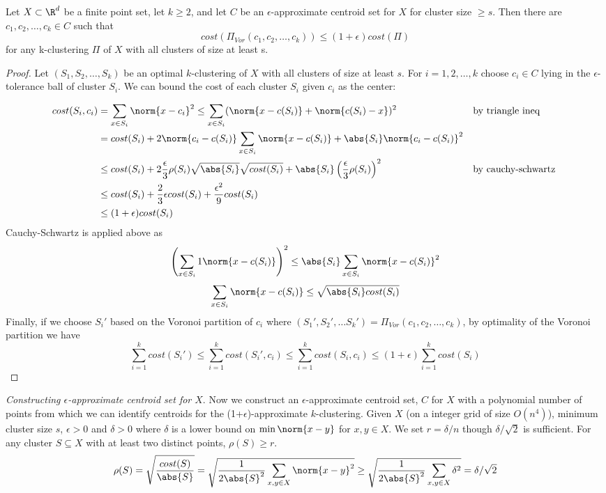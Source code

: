 \begin{lemma}
Let $X \subset \R^d$ be a finite point set, let $k\geq 2$, and let $C$ be an $\epsilon$-approximate centroid set for $X$ for cluster size $\geq s$. Then there are $c_1, c_2, \dots, c_k \in C$ such that 
$$cost(\Pi_{Vor}(c_1, c_2, \dots, c_k)) \leq (1+\epsilon)cost(\Pi)$$
for any k-clustering $\Pi$ of $X$ with all clusters of size at least s. 
\end{lemma}
\begin{proof}
Let $(S_1, S_2, \dots, S_k)$ be an optimal $k$-clustering of $X$ with all clusters of size at least $s$. For $i = 1,2,\dots,k$ choose $c_i \in C$ lying in the $\epsilon$-tolerance ball of cluster $S_i$. We can bound the cost of each cluster $S_i$ given $c_i$ as the center:

\begin{align*}
    cost(S_i, c_i) & = \sum_{x \in S_i}\norm{x-c_i}^2 \leq \sum_{x \in S_i} (\norm{x-c(S_i)} + \norm{c(S_i)-x})^2  && \text{by triangle ineq} \\
    & = cost(S_i) + 2\norm{c_i-c(S_i)}\sum_{x \in S_i}\norm{x-c(S_i)} + \abs{S_i}\norm{c_i-c(S_i)}^2 \\
    & \leq cost(S_i) + 2\frac{\epsilon}{3}\rho(S_i)\sqrt{\abs{S_i}}\sqrt{cost(S_i)} + \abs{S_i}\left(\frac{\epsilon}{3}\rho(S_i) \right)^2 && \text{by cauchy-schwartz } \\
    & \leq cost(S_i) + \frac{2}{3}\epsilon cost(S_i) + \frac{\epsilon^2}{9}cost(S_i) \\
    & \leq (1+\epsilon) cost(S_i)
\end{align*}
Cauchy-Schwartz is applied above as
$$\left( \sum_{x \in S_i}1\norm{x-c(S_i)} \right)^2 \leq \abs{S_i}\sum_{x \in S_i}\norm{x-c(S_i)}^2 $$
$$ \sum_{x \in S_i}\norm{x-c(S_i)} \leq \sqrt{\abs{S_i}cost(S_i)} $$
Finally, if we choose $S_i'$ based on the Voronoi partition of $c_i$
where $(S_1', S_2', \dots S_k') =\Pi_{Vor}(c_1, c_2, \dots, c_k) $, by optimality of the Voronoi partition we have
$$\sum_{i=1}^k cost(S_i') \leq \sum_{i=1}^k cost(S_i', c_i) \leq \sum_{i=1}^k cost(S_i, c_i) \leq (1+\epsilon) \sum_{i=1}^k cost(S_i)$$
\end{proof}

\noindent \emph{Constructing $\epsilon$-approximate centroid set for $X$}. Now we construct an $\epsilon$-approximate centroid set, $C$ for $X$ with a polynomial number of points from which we can identify centroids for the (1+$\epsilon$)-approximate $k$-clustering. Given $X$ (on a integer grid of size $O(n^4)$), minimum cluster size $s$, $\epsilon >0$ and $\delta >0$ where $\delta$ is a lower bound on $\min\norm{x-y}$ for $x,y\in X$. We set $r = \delta/n$ though $\delta/\sqrt{2}$ is sufficient. For any cluster $S \subseteq X$ with at least two distinct points, $\rho(S)\geq r$. 
 $$\rho(S) = \sqrt{\frac{cost(S)}{\abs{S}}} = \sqrt{\frac{1}{2\abs{S}^2}\sum_{x,y \in X}\norm{x-y}^2} \geq \sqrt{\frac{1}{2\abs{S}^2}\sum_{x,y \in X}\delta^2} =  \delta/\sqrt{2}$$
 
